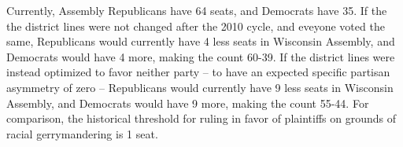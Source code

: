 \documentclass[preprint,12pt]{article}
\begin{document}
Currently, Assembly Republicans have 64 seats, and Democrats have 35.
If the the district lines were not changed after the 2010 cycle, and eveyone voted the same, 
Republicans would currently have 4 less seats in Wisconsin Assembly, and Democrats would have 4 more, making the count 60-39.
If the district lines were instead optimized to favor neither party -- to have an expected specific partisan asymmetry of zero -- 
Republicans would currently have 9 less seats in Wisconsin Assembly, and Democrats would have 9 more, making the count 55-44.
For comparison, the historical threshold for ruling in favor of plaintiffs on grounds of racial gerrymandering is 1 seat.
\end{document}
